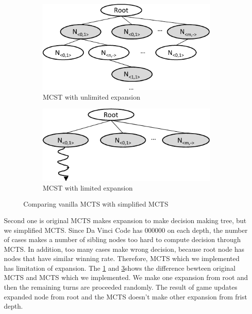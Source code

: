 \begin{figure}
\begin{subfigure}[b]{0.95\columnwidth}
\includegraphics [width=0.95\columnwidth]{figures/sub_compare_expansion_1.pdf}
\caption{MCST with unlimited expansion}
\label{fig:expansion}
\end{subfigure}
\par\bigskip
\begin{subfigure}[b]{0.95\columnwidth}
\includegraphics [width=0.95\columnwidth]{figures/sub_compare_expansion_2.pdf}
\caption{MCST with limited expansion}
\label{fig:limited_expansion}
\end{subfigure}
\caption{Comparing vanilla MCTS with simplified MCTS}
\end{figure}

Second one is original MCTS makes expansion to make decision making tree, but we simplified MCTS. 
Since Da Vinci Code has 000000 on each depth, the number of cases makes a number of sibling nodes too hard to compute decision through MCTS. 
In addition, too many cases make wrong decision, because root node has nodes that have similar winning rate. 
Therefore, MCTS which we implemented has limitation of expansion. 
The \cref{fig:expansion} and \cref{fig:limited_expansion}shows the difference bewteen original MCTS and MCTS which we implemented. 
We make one expansion from root and then the remaining turns are proceeded randomly. 
The result of game updates expanded node from root and the MCTS doesn't make other expansion from frist depth. 


